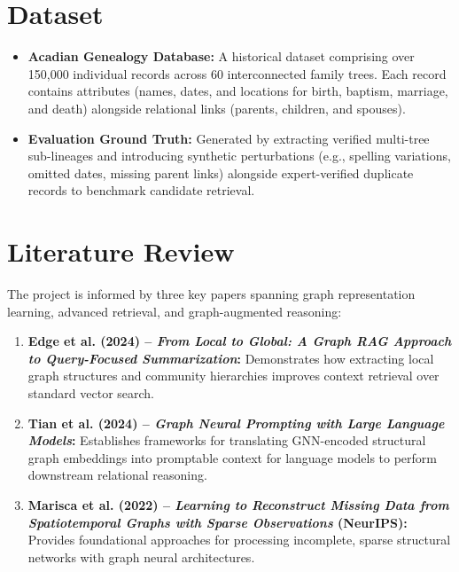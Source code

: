 \documentclass[11pt, a4paper]{article}
\begin{document}
\section{Dataset}
\begin{itemize}
    \item \textbf{Acadian Genealogy Database:} A historical dataset comprising over 150,000 individual records across 60 interconnected family trees. Each record contains attributes (names, dates, and locations for birth, baptism, marriage, and death) alongside relational links (parents, children, and spouses).
    \item \textbf{Evaluation Ground Truth:} Generated by extracting verified multi-tree sub-lineages and introducing synthetic perturbations (e.g., spelling variations, omitted dates, missing parent links) alongside expert-verified duplicate records to benchmark candidate retrieval.
\end{itemize}

\section{Literature Review}
The project is informed by three key papers spanning graph representation learning, advanced retrieval, and graph-augmented reasoning:
\begin{enumerate}
    \item \textbf{Edge et al. (2024) -- \textit{From Local to Global: A Graph RAG Approach to Query-Focused Summarization}:} Demonstrates how extracting local graph structures and community hierarchies improves context retrieval over standard vector search.
    \item \textbf{Tian et al. (2024) -- \textit{Graph Neural Prompting with Large Language Models}:} Establishes frameworks for translating GNN-encoded structural graph embeddings into promptable context for language models to perform downstream relational reasoning.
    \item \textbf{Marisca et al. (2022) -- \textit{Learning to Reconstruct Missing Data from Spatiotemporal Graphs with Sparse Observations} (NeurIPS):} Provides foundational approaches for processing incomplete, sparse structural networks with graph neural architectures.
\end{enumerate}
\end{document}
